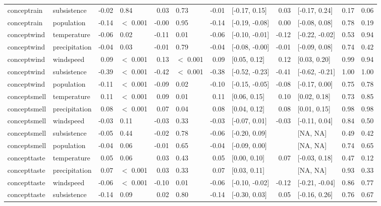 \begin{table}[ht]
\begin{tabular}{llrlrlrlrlrr}
  conceptrain & subsistence & -0.02 & 0.84 & 0.03 & 0.73 & -0.01 & [-0.17, 0.15] & 0.03 & [-0.17, 0.24] & 0.17 & 0.06 \\ 
  conceptrain & population & -0.14 & $<$ 0.001 & -0.00 & 0.95 & -0.14 & [-0.19, -0.08] & 0.00 & [-0.08, 0.08] & 0.78 & 0.19 \\ 
  conceptwind & temperature & -0.06 & 0.02 & -0.11 & 0.01 & -0.06 & [-0.10, -0.01] & -0.12 & [-0.22, -0.02] & 0.53 & 0.94 \\ 
  conceptwind & precipitation & -0.04 & 0.03 & -0.01 & 0.79 & -0.04 & [-0.08, -0.00] & -0.01 & [-0.09, 0.08] & 0.74 & 0.42 \\ 
  conceptwind & windspeed & 0.09 & $<$ 0.001 & 0.13 & $<$ 0.001 & 0.09 & [0.05, 0.12] & 0.12 & [0.03, 0.20] & 0.99 & 0.94 \\ 
  conceptwind & subsistence & -0.39 & $<$ 0.001 & -0.42 & $<$ 0.001 & -0.38 & [-0.52, -0.23] & -0.41 & [-0.62, -0.21] & 1.00 & 1.00 \\ 
  conceptwind & population & -0.11 & $<$ 0.001 & -0.09 & 0.02 & -0.10 & [-0.15, -0.05] & -0.08 & [-0.17, 0.00] & 0.75 & 0.78 \\ 
  conceptsmell & temperature & 0.11 & $<$ 0.001 & 0.09 & 0.01 & 0.11 & [0.06, 0.15] & 0.10 & [0.02, 0.18] & 0.73 & 0.85 \\ 
  conceptsmell & precipitation & 0.08 & $<$ 0.001 & 0.07 & 0.04 & 0.08 & [0.04, 0.12] & 0.08 & [0.01, 0.15] & 0.98 & 0.98 \\ 
  conceptsmell & windspeed & -0.03 & 0.11 & -0.03 & 0.33 & -0.03 & [-0.07, 0.01] & -0.03 & [-0.11, 0.04] & 0.84 & 0.50 \\ 
  conceptsmell & subsistence & -0.05 & 0.44 & -0.02 & 0.78 & -0.06 & [-0.20, 0.09] &  & [NA, NA] & 0.49 & 0.42 \\ 
  conceptsmell & population & -0.04 & 0.06 & -0.01 & 0.65 & -0.04 & [-0.09, 0.00] &  & [NA, NA] & 0.74 & 0.65 \\ 
  concepttaste & temperature & 0.05 & 0.06 & 0.03 & 0.43 & 0.05 & [0.00, 0.10] & 0.07 & [-0.03, 0.18] & 0.47 & 0.12 \\ 
  concepttaste & precipitation & 0.07 & $<$ 0.001 & 0.03 & 0.33 & 0.07 & [0.03, 0.11] &  & [NA, NA] & 0.93 & 0.33 \\ 
  concepttaste & windspeed & -0.06 & $<$ 0.001 & -0.10 & 0.01 & -0.06 & [-0.10, -0.02] & -0.12 & [-0.21, -0.04] & 0.86 & 0.77 \\ 
  concepttaste & subsistence & -0.14 & 0.09 & 0.02 & 0.80 & -0.14 & [-0.30, 0.03] & 0.05 & [-0.16, 0.26] & 0.76 & 0.67 \\ 

\end{tabular}
\end{table}
